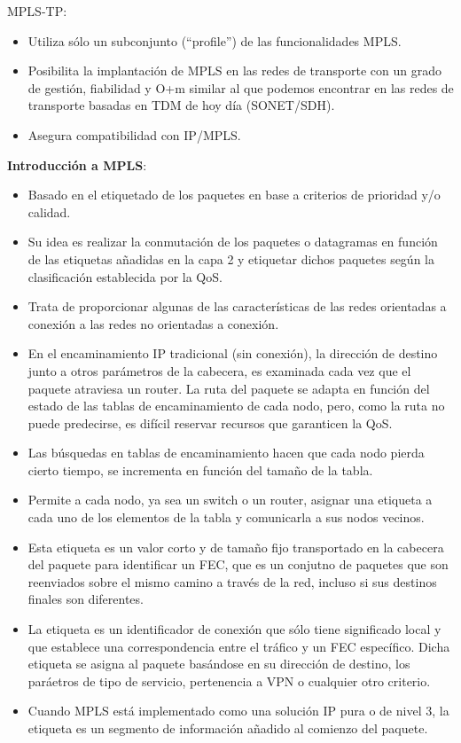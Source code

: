 \documentclass[10pt,portrait, twocolumn]{article}
\begin{document}
MPLS-TP:
	\begin{itemize}
	\item Utiliza sólo un subconjunto (``profile'') de las funcionalidades MPLS.
	\item Posibilita la implantación de MPLS en las redes de transporte con un grado de gestión, fiabilidad y O+m similar al que podemos encontrar en las redes de transporte basadas en TDM de hoy día (SONET/SDH).
	\item Asegura compatibilidad con IP/MPLS.
	\end{itemize}
	
\textbf{Introducción a MPLS}:
	\begin{itemize}
	\item Basado en el etiquetado de los paquetes en base a criterios de prioridad y/o calidad.
	\item Su idea es realizar la conmutación de los paquetes o datagramas en función de las etiquetas añadidas en la capa 2 y etiquetar dichos paquetes según la clasificación establecida por la QoS.
	\item Trata de proporcionar algunas de las características de las redes orientadas a conexión a las redes no orientadas a conexión.
	\item En el encaminamiento IP tradicional (sin conexión), la dirección de destino junto a otros parámetros de la cabecera, es examinada cada vez que el paquete atraviesa un router. La ruta del paquete se adapta en función del estado de las tablas de encaminamiento de cada nodo, pero, como la ruta no puede predecirse, es difícil reservar recursos que garanticen la QoS.
	\item Las búsquedas en tablas de encaminamiento hacen que cada nodo pierda cierto tiempo, se incrementa en función del tamaño de la tabla.
	\item Permite a cada nodo, ya sea un switch o un router, asignar una etiqueta a cada uno de los elementos de la tabla y comunicarla a sus nodos vecinos. 
	\item Esta etiqueta es un valor corto y de tamaño fijo transportado en la cabecera del paquete para identificar un FEC, que es un conjutno de paquetes que son reenviados sobre el mismo camino a través de la red, incluso si sus destinos finales son diferentes.
	\item La etiqueta es un identificador de conexión que sólo tiene significado local y que establece una correspondencia entre el tráfico y un FEC específico. Dicha etiqueta se asigna al paquete basándose en su dirección de destino, los paráetros de tipo de servicio, pertenencia a VPN o cualquier otro criterio.
	\item Cuando MPLS está implementado como una solución IP pura o de nivel 3, la etiqueta es un segmento de información añadido al comienzo del paquete.
	\end{itemize}
	
\end{document}
